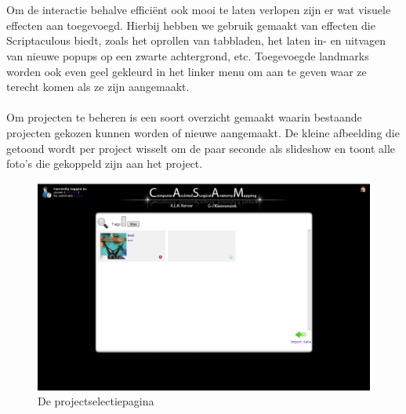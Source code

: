 \\
\\
Om de interactie behalve effici\"{e}nt ook mooi te laten verlopen zijn er wat visuele effecten aan toegevoegd. Hierbij hebben we gebruik gemaakt van effecten die Scriptaculous biedt, zoals het oprollen van tabbladen, het laten in- en uitvagen van nieuwe popups op een zwarte achtergrond, etc. Toegevoegde landmarks worden ook even geel gekleurd in het linker menu om aan te geven waar ze terecht komen als ze zijn aangemaakt. 
\\
\\
Om projecten te beheren is een soort overzicht gemaakt waarin bestaande projecten gekozen kunnen worden of nieuwe aangemaakt. De kleine afbeelding die getoond wordt per project wisselt om de paar seconde als slideshow en toont alle foto's die gekoppeld zijn aan het project.

\begin{figure}[htbp]
\includegraphics[width=\textwidth]{fig_home}
\caption{De projectselectiepagina}
\label{fig:projectselectiescherm}
\end{figure}

